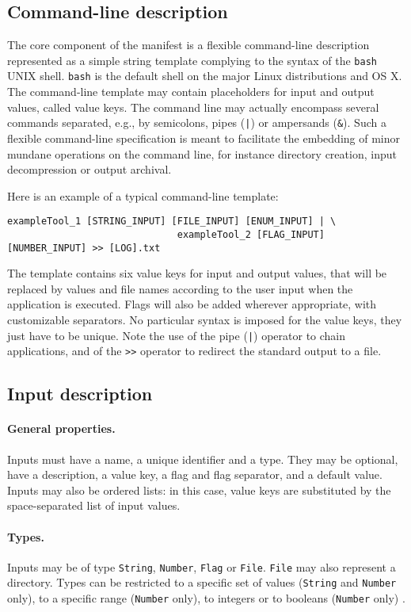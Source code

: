 \documentclass{article}
\begin{document}
\subsection{Command-line description}

The core component of the manifest is a flexible command-line
description represented as a simple string template complying to the
syntax of the \texttt{bash} UNIX shell. \texttt{bash} is the default
shell on the major Linux distributions and OS X. The command-line
template may contain placeholders for input and output values, called
value keys. The command line may actually
encompass several commands separated, e.g., by semicolons, pipes
(\texttt{|}) or ampersands (\texttt{\&}). Such a flexible command-line
specification is meant to facilitate the embedding of minor mundane
operations on the command line, for instance directory creation, input
decompression or output archival.

Here is an example of a typical command-line template:
\begin{verbatim}
exampleTool_1 [STRING_INPUT] [FILE_INPUT] [ENUM_INPUT] | \
                              exampleTool_2 [FLAG_INPUT] [NUMBER_INPUT] >> [LOG].txt
\end{verbatim}
The template contains six value keys for input and output values, that
will be replaced by values and file names according to the user input
when the application is executed. Flags will also be added wherever
appropriate, with customizable separators. No particular syntax is
imposed for the value keys, they just have to be unique.  Note the use
of the pipe (\texttt{|}) operator to chain applications, and of the
\texttt{>>} operator to redirect the standard output to a file.

\subsection{Input description}

\paragraph{General properties.} Inputs must have a name, a unique
identifier and a type. They may be optional, have a description, a
value key, a flag and flag separator, and a default value. Inputs may
also be ordered lists: in this case, value keys are substituted by the
space-separated list of input values.

\paragraph{Types.} Inputs may be of type \texttt{String},
\texttt{Number}, \texttt{Flag} %
or \texttt{File}. \texttt{File} may
also represent a directory. Types can be restricted to a specific set
of values (\texttt{String} %
and \texttt{Number} only), to a specific
range (\texttt{Number} only), to integers or to booleans (\texttt{Number}
only) %
.
\end{document}

